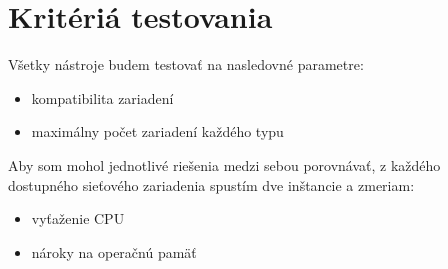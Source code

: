\chapter{Kritériá testovania}

Všetky nástroje budem testovať na nasledovné parametre:
\begin{itemize}
\item kompatibilita zariadení
\item maximálny počet zariadení každého typu
\end{itemize}

Aby som mohol jednotlivé riešenia medzi sebou porovnávať, z každého dostupného sieťového zariadenia spustím dve inštancie a zmeriam:
\begin{itemize}
\item vyťaženie CPU
\item nároky na operačnú pamäť
\end{itemize}

